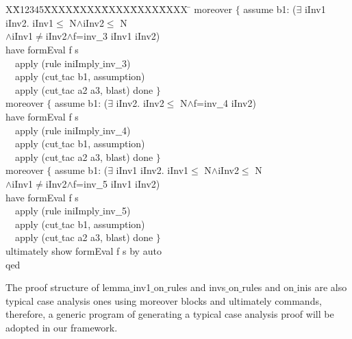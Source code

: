 \documentclass[final]{IEEEtran}
\newlength{\fminilength}
\newenvironment{fmini}[1][\linewidth]
  {\setlength{\fminilength}{#1\fboxsep-2\fboxrule}%
   \vspace{2ex}\noindent\begin{lrbox}{\fminibox}\begin{minipage}{\fminilength}%
   \mbox{ }\hfill\vspace{-2.5ex}}%
  {\end{minipage}\end{lrbox}\vspace{1ex}\hspace{0ex}%
   \framebox{\usebox{\fminibox}}}
\newenvironment{specification}
{\noindent\scriptsize
\tt\begin{fmini}\begin{tabbing}X\=X12345\=XXXX\=XXXX\=XXXX\=XXXX\=XXXX
\=\+\kill} {\end{tabbing}\normalfont\end{fmini}}
\def \twoSpaces {\ \ }
\def \iInv {iInv}
\begin{document}
{\begin{specification}
    moreover $\{$
      assume b1:
($\exists$ \iInv1 \iInv2. \iInv1$\le$
N$\wedge$\iInv2$\le$
N\\
$\wedge$\iInv1$\neq$\iInv2$\wedge$f=inv$\_$$\_$3  \iInv1 \iInv2)\\

      have
formEval f s\\

\twoSpaces      apply (rule iniImply$\_$inv$\_$$\_$3)\\
\twoSpaces      apply (cut$\_$tac b1, assumption)\\
\twoSpaces      apply (cut$\_$tac a2 a3, blast) done
    $\}$\\


    moreover $\{$
      assume b1:
($\exists$ \iInv2. \iInv2$\le$
N$\wedge$f=inv$\_$$\_$4  \iInv2)\\

      have
formEval f s\\

\twoSpaces      apply (rule iniImply$\_$inv$\_$$\_$4)\\
\twoSpaces      apply (cut$\_$tac b1, assumption)\\
\twoSpaces      apply (cut$\_$tac a2 a3, blast) done
    $\}$\\


    moreover $\{$
      assume b1:
($\exists$ \iInv1 \iInv2. \iInv1$\le$
N$\wedge$\iInv2$\le$
N\\
$\wedge$\iInv1$\neq$\iInv2$\wedge$f=inv$\_$$\_$5  \iInv1 \iInv2)\\

      have
formEval f s\\

\twoSpaces      apply (rule iniImply$\_$inv$\_$$\_$5)\\
\twoSpaces      apply (cut$\_$tac b1, assumption)\\
\twoSpaces      apply (cut$\_$tac a2 a3, blast) done
    $\}$\\


  ultimately show formEval f s
  by auto\\
qed\\


\end{specification}

The proof structure of {\sf lemma$\_$inv1$\_$on$\_$rules} and  {\sf invs$\_$on$\_$rules} and {\sf on$\_$inis} are also typical case analysis ones using {\sf moreover} blocks and {\sf ultimately} commands, therefore, a generic program of generating a typical case analysis proof will be adopted in our framework.

}
\end{document}
